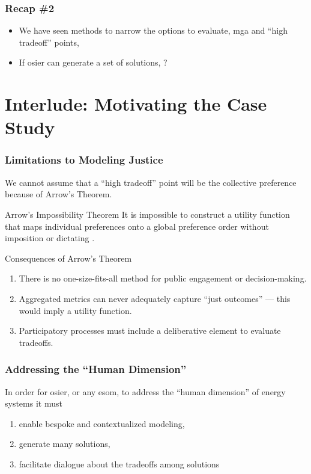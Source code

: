 \begin{frame}
    \frametitle{Recap \#2}
    \begin{itemize}
        \item We have seen methods to narrow the options to evaluate, \gls{mga} and ``high tradeoff'' points, 
        \item If \gls{osier} can generate a set of solutions, ?
    \end{itemize}
\end{frame}
    
\section{Interlude: Motivating the Case Study}

\begin{frame}
    \frametitle{Limitations to Modeling Justice}
    We cannot assume that a ``high tradeoff'' point will be the collective preference because of Arrow's Theorem.
    \pause
    \begin{block}{Arrow's Impossibility Theorem}
        It is impossible to construct a utility function
        that maps individual preferences onto a global preference
        order without imposition or dictating \cite{arrow_difficulty_1950,franssen_arrows_2005}.
    \end{block}
    \pause
    \begin{block}{Consequences of Arrow's Theorem}
        \begin{enumerate}[<+->]
            \item There is no one-size-fits-all method for public engagement or
            decision-making.
            \item Aggregated metrics can never adequately capture ``just outcomes'' ---
            this would imply a utility function.
            \item Participatory processes must include a deliberative element to evaluate
            tradeoffs.
        \end{enumerate}
    \end{block}
\end{frame}

\begin{frame}
    \frametitle{Addressing the ``Human Dimension''}
    In order for \gls{osier}, or any \gls{esom}, to address the ``human dimension'' of energy systems it must
    \begin{enumerate}[<+->]
        \item enable bespoke and contextualized modeling,
        \item generate many solutions,
        \item facilitate dialogue about the tradeoffs among solutions
    \end{enumerate}

\end{frame}

